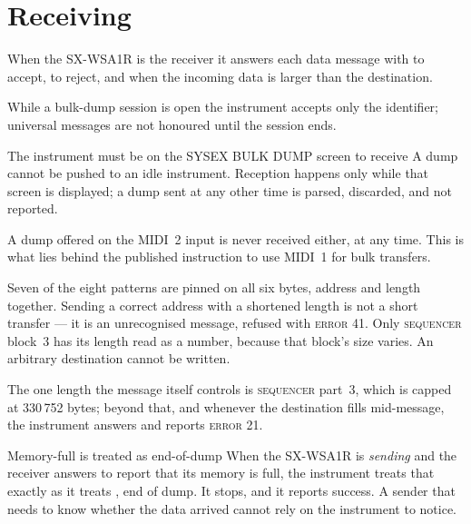 \section{Receiving}
When the SX-WSA1R is the receiver it answers each data message with
 to accept,  to reject, and
 when the incoming data is larger than the destination.

While a bulk-dump session is open the instrument accepts only the  identifier;
universal messages are not honoured until the session ends.

\begin{caution}{The instrument must be on the SYSEX BULK DUMP screen to receive}
A dump cannot be pushed to an idle instrument. Reception happens only while that screen is
displayed; a dump sent at any other time is parsed, discarded, and not reported.

A dump offered on the MIDI~2 input is never received either, at any time. This is what lies
behind the published instruction to use MIDI~1 for bulk transfers.
\end{caution}

Seven of the eight patterns are pinned on all six bytes, address and length together.
Sending a correct address with a shortened length is not a short transfer --- it is an
unrecognised message, refused with \textsc{error 41}. Only \textsc{sequencer} block~3
has its length read as a number, because that block's size varies. An arbitrary
destination cannot be written.

The one length the message itself controls is \textsc{sequencer} part~3, which is capped at
330\,752 bytes; beyond that, and whenever the destination fills mid-message, the
instrument answers  and reports \textsc{error 21}.

\begin{caution}{Memory-full is treated as end-of-dump}
When the SX-WSA1R is \emph{sending} and the receiver answers  to
report that its memory is full, the instrument treats that exactly as it treats
, end of dump. It stops, and it reports success. A sender that needs
to know whether the data arrived cannot rely on the instrument to notice.
\end{caution}
